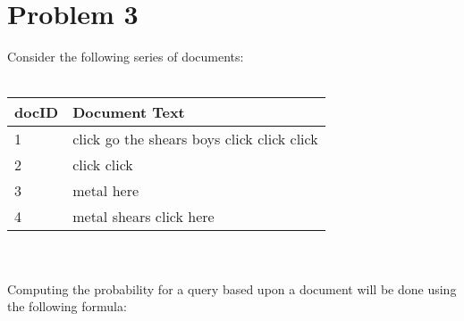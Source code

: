 \documentclass{article}%
\begin{document}
\section*{Problem 3}
Consider the following series of documents:\\
\\
\begin{tabular}{l | l}
    docID & Document Text \\ \hline
    1 & click go the shears boys click click click \\ \hline
    2 & click click \\ \hline
    3 & metal here \\ \hline
    4 & metal shears click here \\ \hline
\end{tabular}\\
\vspace{5mm}\\
Computing the probability for a query based upon a document will be done using the following formula:
\end{document}
